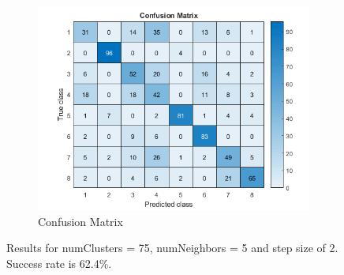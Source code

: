\begin{figure}[h]
\begin{subfigure}{0.3\textwidth}
	\end{subfigure}
	\begin{subfigure}{0.65\textwidth}
		\includegraphics[width=\textwidth]{figures/confusion_75C_5NN_2S.png}
		\caption{Confusion Matrix}
	\end{subfigure}
	\caption{Results for numClusters = 75, numNeighbors = 5 and step size of 2. Success rate is 62.4\%.}
	\label{fig:a5:75c5nn2s}
\end{figure}
